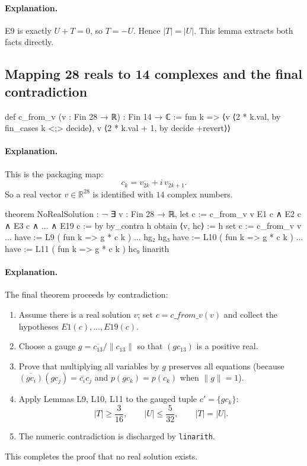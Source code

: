 \documentclass[11pt]{article}
\begin{document}
\paragraph{Explanation.}
E9 is exactly $U+T=0$, so $T=-U$. Hence $|T|=|U|$.
This lemma extracts both facts directly.

\subsection*{Mapping 28 reals to 14 complexes and the final contradiction}

\begin{LeanCode}
def c_from_v (v : Fin 28 → ℝ) : Fin 14 → ℂ :=
  fun k => ⟨v ⟨2 * k.val, by fin_cases k <;> decide⟩,
            v ⟨2 * k.val + 1, by decide +revert⟩⟩
\end{LeanCode}

\paragraph{Explanation.}
This is the packaging map:
\[
c_k = v_{2k} + i\,v_{2k+1}.
\]
So a real vector $v\in\mathbb{R}^{28}$ is identified with $14$ complex numbers.

\begin{LeanCode}
theorem NoRealSolution : ¬ ∃ v : Fin 28 → ℝ,
  let c := c_from_v v
  E1 c ∧ E2 c ∧ E3 c ∧ ... ∧ E19 c := by
  by_contra h
  obtain ⟨v, hc⟩ := h
  set c := c_from_v v
  ...
  have := L9 ( fun k => g * c k ) ... hg₂ hg₃
  have := L10 ( fun k => g * c k ) ...
  have := L11 ( fun k => g * c k ) hc₉
  linarith
\end{LeanCode}

\paragraph{Explanation.}
The final theorem proceeds by contradiction:
\begin{enumerate}
\item Assume there is a real solution $v$; set $c=c\_from\_v(v)$ and collect the hypotheses $E1(c),\dots,E19(c)$.
\item Choose a gauge $g=\overline{c_{13}}/\|c_{13}\|$ so that $(g c_{13})$ is a positive real.
\item Prove that multiplying all variables by $g$ preserves all equations (because $\overline{(g c_i)}(g c_j)=\overline{c_i}c_j$ and $p(gc_k)=p(c_k)$ when $\|g\|=1$).
\item Apply Lemmas L9, L10, L11 to the gauged tuple $c'=\{g c_k\}$:
  \[
  |T|\ge \frac{3}{16},\qquad |U|\le \frac{5}{32},\qquad |T|=|U|.
  \]
\item The numeric contradiction is discharged by \texttt{linarith}.
\end{enumerate}

This completes the proof that no real solution exists.
\end{document}
